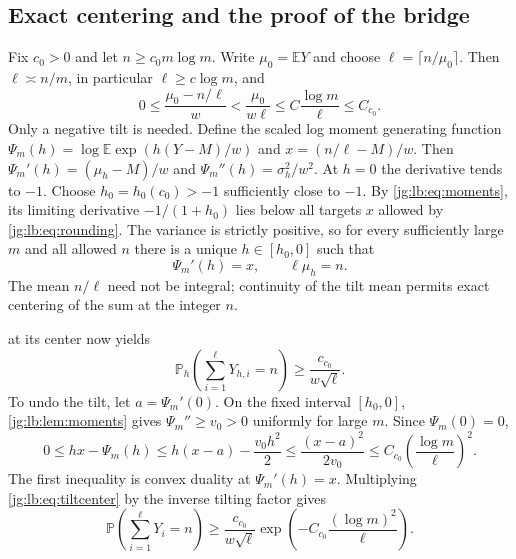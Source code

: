 \documentclass[11pt,a4paper]{article}
\theoremstyle{definition}\newaliascnt{definition}{theorem}
\theoremstyle{remark}\newaliascnt{remark}{theorem}
\newcommand{\ljP}{\mathbb P}
\newcommand{\ljE}{\mathbb E}
\begin{document}
\subsection{Exact centering and the proof of the bridge}
\label{jg:sec:bridge-proof}
Fix $c_0>0$ and let $n\ge c_0m\log m$. Write $\mu_0=\ljE Y$ and choose
$\ell=\lceil n/\mu_0\rceil$. Then $\ell\asymp n/m$, in particular
$\ell\ge c\log m$, and
\begin{equation}\label{jg:lb:eq:rounding}
 0\le\frac{\mu_0-n/\ell}{w}
       <\frac{\mu_0}{w\ell}
       \le C\frac{\log m}{\ell}\le C_{c_0}.
\end{equation}
Only a negative tilt is needed. Define the scaled log moment generating
function $\Psi_m(h)=\log\ljE\exp(h(Y-M)/w)$ and $x=(n/\ell-M)/w$. Then
$\Psi_m'(h)=(\mu_h-M)/w$ and $\Psi_m''(h)=\sigma_h^2/w^2$. At $h=0$ the
derivative tends to $-1$. Choose $h_0=h_0(c_0)>-1$ sufficiently close to $-1$.
By \eqref{jg:lb:eq:moments}, its limiting derivative $-1/(1+h_0)$ lies below all
targets $x$ allowed by \eqref{jg:lb:eq:rounding}. The variance is strictly
positive, so for every sufficiently large $m$ and all allowed $n$ there is a
unique $h\in[h_0,0]$ such that
\begin{equation}\label{jg:lb:eq:centering}
 \Psi_m'(h)=x,\qquad \ell\mu_h=n.
\end{equation}
The mean $n/\ell$ need not be integral; continuity of the tilt mean permits
exact centering of the sum at the integer $n$.

 at its center now yields
\begin{equation}\label{jg:lb:eq:tiltcenter}
 \ljP_h\!\left(\sum_{i=1}^{\ell}Y_{h,i}=n\right)
       \ge \frac{c_{c_0}}{w\sqrt\ell}.
\end{equation}
To undo the tilt, let $a=\Psi_m'(0)$. On the fixed interval $[h_0,0]$,
\cref{jg:lb:lem:moments} gives $\Psi_m''\ge v_0>0$ uniformly for large $m$.
Since $\Psi_m(0)=0$,
\[
 0\le hx-\Psi_m(h)
 \le h(x-a)-\frac{v_0h^2}{2}
 \le\frac{(x-a)^2}{2v_0}
 \le C_{c_0}\left(\frac{\log m}{\ell}\right)^2.
\]
The first inequality is convex duality at $\Psi_m'(h)=x$. Multiplying
\eqref{jg:lb:eq:tiltcenter} by the inverse tilting factor gives
\begin{equation}\label{jg:lb:eq:untilted}
 \ljP\!\left(\sum_{i=1}^{\ell}Y_i=n\right)
 \ge \frac{c_{c_0}}{w\sqrt\ell}
        \exp\!\left(-C_{c_0}\frac{(\log m)^2}{\ell}\right).
\end{equation}
\end{document}
